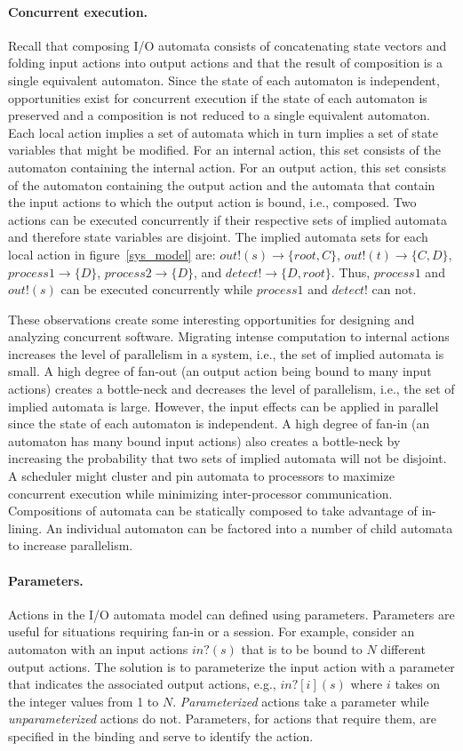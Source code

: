 \paragraph{Concurrent execution.}
Recall that composing I/O automata consists of concatenating state vectors and folding input actions into output actions and that the result of composition is a single equivalent automaton.
Since the state of each automaton is independent, opportunities exist for concurrent execution if the state of each automaton is preserved and a composition is not reduced to a single equivalent automaton.
Each local action implies a set of automata which in turn implies a set of state variables that might be modified.
For an internal action, this set consists of the automaton containing the internal action.
For an output action, this set consists of the automaton containing the output action and the automata that contain the input actions to which the output action is bound, i.e., composed.
Two actions can be executed concurrently if their respective sets of implied automata and therefore state variables are disjoint.
The implied automata sets for each local action in figure~\ref{sys_model} are: $out!(s) \to \{root, C\}$, $out!(t) \to \{C, D\}$, $process1 \to \{D\}$, $process2 \to \{D\}$, and $detect! \to \{D, root\}$.
Thus, $process1$ and $out!(s)$ can be executed concurrently while $process1$ and $detect!$ can not.

These observations create some interesting opportunities for designing and analyzing concurrent software.
Migrating intense computation to internal actions increases the level of parallelism in a system, i.e., the set of implied automata is small.
A high degree of fan-out (an output action being bound to many input actions) creates a bottle-neck and decreases the level of parallelism, i.e., the set of implied automata is large.
However, the input effects can be applied in parallel since the state of each automaton is independent.
A high degree of fan-in (an automaton has many bound input actions) also creates a bottle-neck by increasing the probability that two sets of implied automata will not be disjoint.
A scheduler might cluster and pin automata to processors to maximize concurrent execution while minimizing inter-processor communication.
Compositions of automata can be statically composed to take advantage of in-lining.
An individual automaton can be factored into a number of child automata to increase parallelism.

\paragraph{Parameters.}
Actions in the I/O automata model can defined using parameters.
Parameters are useful for situations requiring fan-in or a session.
For example, consider an automaton with an input actions $in?(s)$ that is to be bound to $N$ different output actions.
The solution is to parameterize the input action with a parameter that indicates the associated output actions, e.g., $in?[i](s)$ where $i$ takes on the integer values from 1 to $N$.
\emph{Parameterized} actions take a parameter while \emph{unparameterized} actions do not.
Parameters, for actions that require them, are specified in the binding and serve to identify the action.

